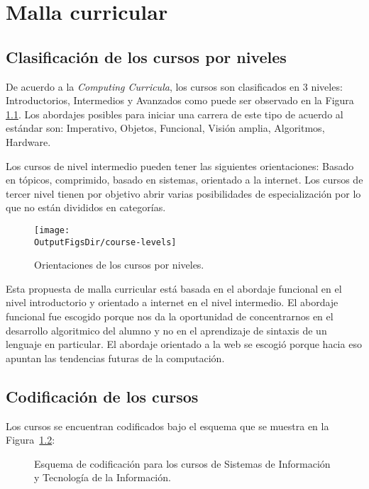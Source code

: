 \chapter{Malla curricular}\label{chap:GeneralInfo}

\section{Clasificación de los cursos por niveles}
De acuerdo a la \textit{Computing Curricula}, los cursos son clasificados en 3 niveles: 
Introductorios, Intermedios y Avanzados como puede ser observado en la Figura \ref{fig:niveles}. 
Los abordajes posibles para iniciar una carrera de este tipo de acuerdo al estándar son: 
Imperativo, Objetos, Funcional, Visión amplia, Algoritmos, Hardware.
 
Los cursos de nivel intermedio pueden tener las siguientes orientaciones: 
Basado en tópicos, comprimido, basado en sistemas, orientado a la internet. 
Los cursos de tercer nivel tienen por objetivo abrir varias posibilidades de 
especialización por lo que no están divididos en categorí­as.

\begin{figure}[ht]
   \centering
   \texttt{[image: \\OutputFigsDir/course-levels]}
   \caption{Orientaciones de los cursos por niveles.}
   \label{fig:niveles}
\end{figure}

Esta propuesta de malla curricular está basada en el abordaje funcional en el nivel introductorio y orientado 
a internet en el nivel intermedio. El abordaje funcional fue escogido porque nos da la oportunidad de 
concentrarnos en el desarrollo algoritmico del alumno y no en el aprendizaje de sintaxis de un lenguaje 
en particular. El abordaje orientado a la web se escogió porque hacia eso apuntan las 
tendencias futuras de la computación.

\section{Codificación de los cursos}
Los cursos se encuentran codificados bajo el esquema que se muestra en la Figura~\ref{fig:course-number}:
\begin{figure}[ht]
   \centering
   \caption{Esquema de codificación para los cursos de Sistemas de Información y Tecnologí­a de la Información.}
   \label{fig:course-number}
\end{figure}

